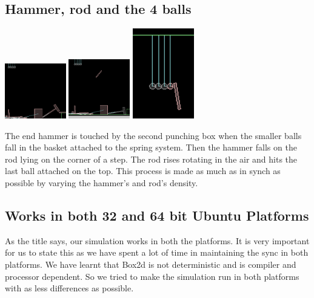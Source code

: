 \documentclass[11pt]{article}
\begin{document}
\subsection{Hammer, rod and the 4 balls}
\begin{center}
\includegraphics[width=0.2\textwidth,height=0.2\textheight]{img/osc1} 
\hspace{2em}
\includegraphics[width=0.2\textwidth,height=0.2\textheight]{img/osc2}
\hspace{2em}
\includegraphics[width=0.2\textwidth,height=0.2\textheight]{img/osc3}
\end{center}
The end hammer is touched by the second punching box when the smaller balls fall in the basket attached to the spring system. Then the hammer falls on the rod lying on the corner of a step. The rod rises rotating in the air and hits the last ball attached on the top. This process is made as much as in synch as possible by varying the hammer's and rod's density.

\subsection{Works in both 32 and 64 bit Ubuntu Platforms}
As the title says, our simulation works in both the platforms. It is very important for us to state this as we have spent a lot of time in maintaining the sync in both platforms. We have learnt that Box2d is not deterministic and is compiler and processor dependent. So we tried to make the simulation run in both platforms with as less differences as possible.
\end{document}
